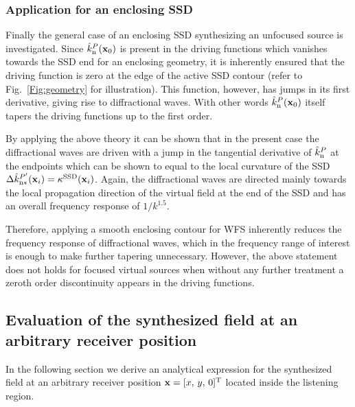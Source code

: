 \documentclass[lettersize,journal]{IEEEtran}
\begin{document}
\subsubsection{Application for an enclosing SSD}
Finally the general case of an enclosing SSD synthesizing an unfocused source is investigated.
Since $\hat{k}_\mathrm{n}^P(\mathbf{x}_0)$ is present in the driving functions which vanishes towards the SSD end for an enclosing geometry, it is inherently ensured that the driving function is zero at the edge of the active SSD contour (refer to Fig.~\ref{Fig:geometry} for illustration). 
This function, however, has jumps in its first derivative, giving rise to diffractional waves. 
With other words $\hat{k}_\mathrm{n}^P(\mathbf{x}_0)$ itself tapers the driving functions up to the first order.

By applying the above theory it can be shown that in the present case the diffractional waves are driven with a jump in the tangential derivative of $\hat{k}_\mathrm{n}^P$ at the endpoints which can be shown to equal to the local curvature of the SSD $\Delta \hat{k}^{P'}_{\mathrm{n}s}(\mathbf{x}_i) = \kappa^{\mathrm{SSD}}(\mathbf{x}_i)$.
Again, the diffractional waves are directed mainly towards the local propagation direction of the virtual field at the end of the SSD and has an overall frequency response of $1/k^{1.5}$.

Therefore, applying a smooth enclosing contour for WFS inherently reduces the frequency response of diffractional waves, which in the frequency range of interest is enough to make further tapering unnecessary.
However, the above statement does not holds for focused virtual sources when without any further treatment a zeroth order discontinuity appears in the driving functions.

\subsection{Evaluation of the synthesized field at an arbitrary receiver position}
In the following section we derive an analytical expression for the synthesized field at an arbitrary receiver position $\mathbf{x} = [x,\, y,\, 0]^{\mathrm{T}}$ located inside the listening region.
\end{document}
